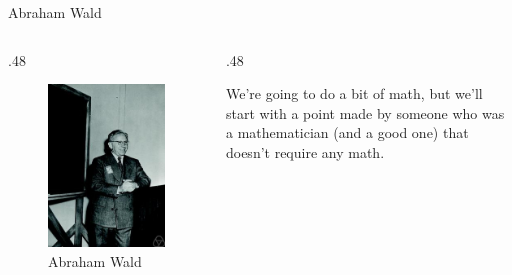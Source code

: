 \documentclass[
  ignorenonframetext,
]{beamer}
\renewcommand{\,}{\text{, }}
\def\begincols{\begin{columns}}
\def\begincol{\begin{column}}
\def\endcol{\end{column}}
\def\endcols{\end{columns}}
\begin{document}
\begin{frame}{Abraham Wald}
\protect\hypertarget{abraham-wald}{}

\begincols
\begincol{.48\textwidth}

\begin{figure}
\centering
\includegraphics{../images/class10/wald_photo.jpg}
\caption{Abraham Wald}
\end{figure}

\endcol
\begincol{.48\textwidth}

We're going to do a bit of math, but we'll start with a point made by
someone who was a mathematician (and a good one) that doesn't require
any math.

\endcol
\endcols

\end{frame}
\end{document}
